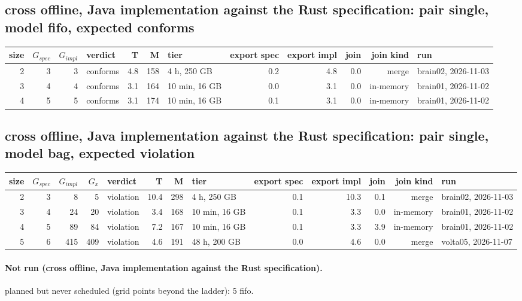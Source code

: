 \documentclass[10pt]{article}
\begin{document}
\subsection*{cross offline, Java implementation against the Rust specification: pair \textsf{single}, model fifo, expected conforms}
\begin{longtable}{@{}rrrlrrlrrrrl@{}}
\toprule
size & $G_{\mathit{spec}}$ & $G_{\mathit{impl}}$ & verdict & T & M & tier & export spec & export impl & join & join kind & run \\
\midrule
\endhead
\color{blue} 2 & 3 & 3 & conforms & 4.8 & 158 & 4 h, 250 GB & 0.2 & 4.8 & 0.0 & merge & brain02, 2026-11-03 \\
\color{red} 3 & 4 & 4 & conforms & 3.1 & 164 & 10 min, 16 GB & 0.0 & 3.1 & 0.0 & in-memory & brain01, 2026-11-02 \\
\color{red} 4 & 5 & 5 & conforms & 3.1 & 174 & 10 min, 16 GB & 0.1 & 3.1 & 0.0 & in-memory & brain01, 2026-11-02 \\
\bottomrule
\end{longtable}
\subsection*{cross offline, Java implementation against the Rust specification: pair \textsf{single}, model bag, expected violation}
\begin{longtable}{@{}rrrrlrrlrrrrl@{}}
\toprule
size & $G_{\mathit{spec}}$ & $G_{\mathit{impl}}$ & $G_x$ & verdict & T & M & tier & export spec & export impl & join & join kind & run \\
\midrule
\endhead
\color{blue} 2 & 3 & 8 & 5 & violation & 10.4 & 298 & 4 h, 250 GB & 0.1 & 10.3 & 0.1 & merge & brain02, 2026-11-03 \\
\color{red} 3 & 4 & 24 & 20 & violation & 3.4 & 168 & 10 min, 16 GB & 0.1 & 3.3 & 0.0 & in-memory & brain01, 2026-11-02 \\
\color{red} 4 & 5 & 89 & 84 & violation & 7.2 & 167 & 10 min, 16 GB & 0.1 & 3.3 & 3.9 & in-memory & brain01, 2026-11-02 \\
\color{red} 5 & 6 & 415 & 409 & violation & 4.6 & 191 & 48 h, 200 GB & 0.0 & 4.6 & 0.0 & merge & volta05, 2026-11-07 \\
\bottomrule
\end{longtable}
\paragraph{Not run (cross offline, Java implementation against the Rust specification).}
planned but never scheduled (grid points beyond the ladder): 5 fifo.\par
\end{document}
